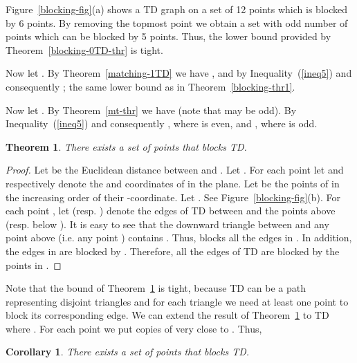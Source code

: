 \documentclass[11pt,a4paper]{article}
\newcommand{\kTD}[2]{\text{-}TD#2}
\newtheorem{corollary}{Corollary}
\newtheorem{theorem}{Theorem}
\begin{document}
Figure~\ref{blocking-fig}(a) shows a \kTD{0}{} graph on a set of 12 points which is blocked by 6 points. By removing the topmost point we obtain a set with odd number of points which can be blocked by 5 points. Thus, the lower bound provided by Theorem~\ref{blocking-0TD-thr} is tight. 

Now let . By Theorem~\ref{matching-1TD} we have , and by Inequality~(\ref{ineq5})  and consequently ; the same lower bound as in Theorem~\ref{blocking-thr1}. 

Now let . By Theorem~\ref{mt-thr} we have  (note that  may be odd). By Inequality~(\ref{ineq5})  and consequently , where  is even, and , where  is odd.  

\begin{theorem}
\label{blocking-thr2}
 There exists a set  of  points that blocks \kTD{0}{}.
\end{theorem}
\begin{proof}
Let  be the Euclidean distance between  and . Let .
 For each point  let  and  respectively denote the  and  coordinates of  in the plane. Let  be the points of  in the increasing order of their -coordinate. Let . See Figure~\ref{blocking-fig}(b). For each point , let  (resp. ) denote the edges of \kTD{0}{} between  and the points above  (resp. below ). It is easy to see that the downward triangle between  and any point  above  (i.e. any point ) contains . Thus,  blocks all the edges in . In addition, the edges in  are blocked by . Therefore, all the edges of \kTD{0}{} are blocked by the  points in .
\end{proof}
Note that the bound of Theorem~\ref{blocking-thr2} is tight, because \kTD{0}{} can be a path representing  disjoint triangles and for each triangle we need at least one point to block its corresponding edge. 
We can extend the result of Theorem~\ref{blocking-thr2} to \kTD{k}{} where . For each point  we put  copies of  very close to . Thus, 

\begin{corollary}
 There exists a set  of  points that blocks \kTD{k}{}.
\end{corollary}
\end{document}
